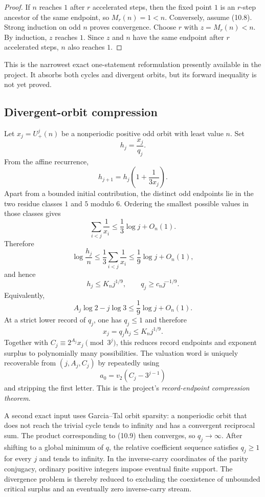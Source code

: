 \documentclass[11pt]{article}
\theoremstyle{definition}
\theoremstyle{remark}
\newcommand{\Up}{U_{+}}
\newcommand{\vTwo}{v_2}
\begin{document}
\begin{proof}
If $n$ reaches $1$ after $r$ accelerated steps, then the fixed point $1$ is
an $r$-step ancestor of the same endpoint, so $M_r(n)=1<n$.
Conversely, assume \textup{(10.8)}.  Strong induction on odd $n$ proves
convergence.  Choose $r$ with $z=M_r(n)<n$.  By induction, $z$ reaches $1$.
Since $z$ and $n$ have the same endpoint after $r$ accelerated steps, $n$
also reaches $1$.
\end{proof}

This is the narrowest exact one-statement reformulation presently available
in the project.  It absorbs both cycles and divergent orbits, but its forward
inequality is not yet proved.

\subsection{Divergent-orbit compression}

Let $x_j=\Up^j(n)$ be a nonperiodic positive odd orbit with least value $n$.
Set
\[
 h_j=\frac{x_j}{q_j}.
\]
From the affine recurrence,
\[
 h_{j+1}=h_j\left(1+\frac1{3x_j}\right).              \tag{10.9}
\]
Apart from a bounded initial contribution, the distinct odd endpoints lie in
the two residue classes $1$ and $5$ modulo $6$.  Ordering the smallest
possible values in those classes gives
\[
 \sum_{i<j}\frac1{x_i}\le\frac13\log j+O_n(1).       \tag{10.10}
\]
Therefore
\[
 \log\frac{h_j}{n}
 \le\frac13\sum_{i<j}\frac1{x_i}
 \le\frac19\log j+O_n(1),                            \tag{10.11}
\]
and hence
\[
 h_j\le K_nj^{1/9},\qquad
 q_j\ge c_nj^{-1/9}.                                  \tag{10.12}
\]
Equivalently,
\[
 A_j\log2-j\log3\le\frac19\log j+O_n(1).             \tag{10.13}
\]
At a strict lower record of $q_j$, one has $q_j\le1$ and therefore
\[
 x_j=q_jh_j\le K_nj^{1/9}.                             \tag{10.14}
\]
Together with
$C_j\equiv2^{A_j}x_j\pmod{3^j}$, this reduces record endpoints and exponent
surplus to polynomially many possibilities.  The valuation word is uniquely
recoverable from $(j,A_j,C_j)$ by repeatedly using
\[
 a_0=\vTwo(C_j-3^{j-1})                                \tag{10.15}
\]
and stripping the first letter.  This is the project's
\emph{record-endpoint compression theorem}.

A second exact input uses Garcia--Tal orbit sparsity: a nonperiodic orbit that
does not reach the trivial cycle tends to infinity and has a convergent
reciprocal sum.  The product corresponding to \textup{(10.9)} then converges,
so $q_j\to\infty$.  After shifting to a global minimum of $q$, the relative
coefficient sequence satisfies $q_j\ge1$ for every $j$ and tends to infinity.
In the inverse-carry coordinates of the parity conjugacy, ordinary positive
integers impose eventual finite support.  The divergence problem is thereby
reduced to excluding the coexistence of unbounded critical surplus and an
eventually zero inverse-carry stream.
\end{document}
